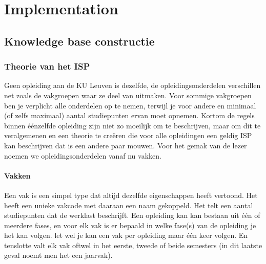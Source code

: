 \chapter{Implementation}
\label{cha:implementation}

\section{Knowledge base constructie}

\subsection{Theorie van het ISP}
Geen opleiding aan de KU Leuven is dezelfde, de opleidingsonderdelen verschillen net zoals de vakgroepen waar ze deel van uitmaken. Voor sommige vakgroepen ben je verplicht alle onderdelen op te nemen, terwijl je voor andere en minimaal (of zelfs maximaal) aantal studiepunten ervan moet opnemen. Kortom de regels binnen \'{e}\'{e}nzelfde opleiding zijn niet zo moeilijk om te beschrijven, maar om dit te veralgemenen en een theorie te cre\"{e}ren die voor alle opleidingen een geldig ISP kan beschrijven dat is een andere paar mouwen. Voor het gemak van de lezer noemen we opleidingsonderdelen vanaf nu vakken.

\subsubsection{Vakken}
Een vak is een simpel type dat altijd dezelfde eigenschappen heeft vertoond. Het heeft een unieke vakcode met daaraan een naam gekoppeld. Het telt een aantal studiepunten dat de werklast beschrijft.
Een opleiding kan kan bestaan uit \'{e}\'{e}n of meerdere fases, en voor elk vak is er bepaald in welke fase(s) van de opleiding je het kan volgen. let wel je kan een vak per opleiding maar \'{e}\'{e}n keer volgen. En tenslotte valt elk vak oftwel in het eerste, tweede of beide semesters (in dit laatste geval noemt men het een jaarvak).

